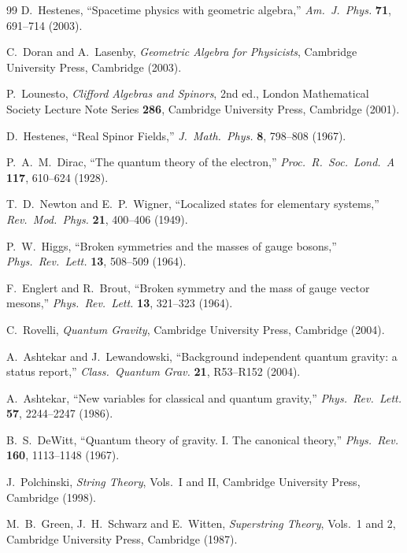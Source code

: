 \documentclass[a4paper]{article}
\begin{document}
\begin{thebibliography}{99}
D.~Hestenes,
``Spacetime physics with geometric algebra,''
\textit{Am.\ J.\ Phys.} \textbf{71}, 691--714 (2003).

C.~Doran and A.~Lasenby,
\textit{Geometric Algebra for Physicists},
Cambridge University Press, Cambridge (2003).

P.~Lounesto,
\textit{Clifford Algebras and Spinors}, 2nd ed.,
London Mathematical Society Lecture Note Series \textbf{286},
Cambridge University Press, Cambridge (2001).

D.~Hestenes,
``Real Spinor Fields,''
\textit{J.\ Math.\ Phys.} \textbf{8}, 798--808 (1967).

P.~A.~M.~Dirac,
``The quantum theory of the electron,''
\textit{Proc.\ R.\ Soc.\ Lond.\ A} \textbf{117}, 610--624 (1928).

T.~D.~Newton and E.~P.~Wigner,
``Localized states for elementary systems,''
\textit{Rev.\ Mod.\ Phys.} \textbf{21}, 400--406 (1949).

P.~W.~Higgs,
``Broken symmetries and the masses of gauge bosons,''
\textit{Phys.\ Rev.\ Lett.} \textbf{13}, 508--509 (1964).

F.~Englert and R.~Brout,
``Broken symmetry and the mass of gauge vector mesons,''
\textit{Phys.\ Rev.\ Lett.} \textbf{13}, 321--323 (1964).

C.~Rovelli,
\textit{Quantum Gravity},
Cambridge University Press, Cambridge (2004).

A.~Ashtekar and J.~Lewandowski,
``Background independent quantum gravity: a status report,''
\textit{Class.\ Quantum Grav.} \textbf{21}, R53--R152 (2004).

A.~Ashtekar,
``New variables for classical and quantum gravity,''
\textit{Phys.\ Rev.\ Lett.} \textbf{57}, 2244--2247 (1986).

B.~S.~DeWitt,
``Quantum theory of gravity. I. The canonical theory,''
\textit{Phys.\ Rev.} \textbf{160}, 1113--1148 (1967).

J.~Polchinski,
\textit{String Theory}, Vols.\ I and II,
Cambridge University Press, Cambridge (1998).

M.~B.~Green, J.~H.~Schwarz and E.~Witten,
\textit{Superstring Theory}, Vols.\ 1 and 2,
Cambridge University Press, Cambridge (1987).


\end{thebibliography}
\end{document}

